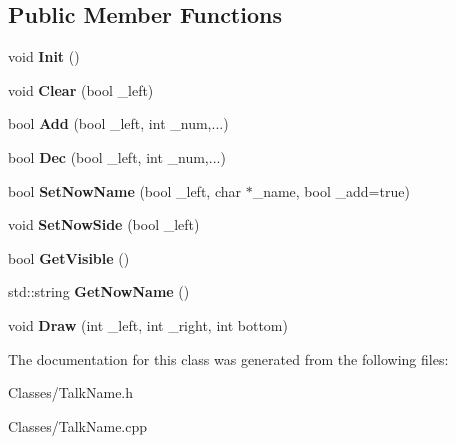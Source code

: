 \subsection*{Public Member Functions}
\begin{DoxyCompactItemize}
\item 
void {\bfseries Init} ()\hypertarget{class_c_talk_name_a3ef60366e54f087ce720012e49413989}{}\label{class_c_talk_name_a3ef60366e54f087ce720012e49413989}

\item 
void {\bfseries Clear} (bool \+\_\+left)\hypertarget{class_c_talk_name_a0882a63ec1fbb6baf7dc35e8db8946de}{}\label{class_c_talk_name_a0882a63ec1fbb6baf7dc35e8db8946de}

\item 
bool {\bfseries Add} (bool \+\_\+left, int \+\_\+num,...)\hypertarget{class_c_talk_name_a1ac94e10cca5b4fb684f1800c71ec51d}{}\label{class_c_talk_name_a1ac94e10cca5b4fb684f1800c71ec51d}

\item 
bool {\bfseries Dec} (bool \+\_\+left, int \+\_\+num,...)\hypertarget{class_c_talk_name_a38910b8d0c6d1ee35a1dc2fa67630d5d}{}\label{class_c_talk_name_a38910b8d0c6d1ee35a1dc2fa67630d5d}

\item 
bool {\bfseries Set\+Now\+Name} (bool \+\_\+left, char $\ast$\+\_\+name, bool \+\_\+add=true)\hypertarget{class_c_talk_name_a1d280a5685ffefc80f7e34347d8aa215}{}\label{class_c_talk_name_a1d280a5685ffefc80f7e34347d8aa215}

\item 
void {\bfseries Set\+Now\+Side} (bool \+\_\+left)\hypertarget{class_c_talk_name_a640f64ba2f900dbdfedc5b7e0b0aaec5}{}\label{class_c_talk_name_a640f64ba2f900dbdfedc5b7e0b0aaec5}

\item 
bool {\bfseries Get\+Visible} ()\hypertarget{class_c_talk_name_af817792d95d0deb8f0fe3456919d1dc9}{}\label{class_c_talk_name_af817792d95d0deb8f0fe3456919d1dc9}

\item 
std\+::string {\bfseries Get\+Now\+Name} ()\hypertarget{class_c_talk_name_a840c6c6f458f56bda0926f5a1cad1df9}{}\label{class_c_talk_name_a840c6c6f458f56bda0926f5a1cad1df9}

\item 
void {\bfseries Draw} (int \+\_\+left, int \+\_\+right, int bottom)\hypertarget{class_c_talk_name_a1a86af6032c1119ae1ce754a9ef7bd95}{}\label{class_c_talk_name_a1a86af6032c1119ae1ce754a9ef7bd95}

\end{DoxyCompactItemize}


The documentation for this class was generated from the following files\+:\begin{DoxyCompactItemize}
\item 
Classes/Talk\+Name.\+h\item 
Classes/Talk\+Name.\+cpp\end{DoxyCompactItemize}
